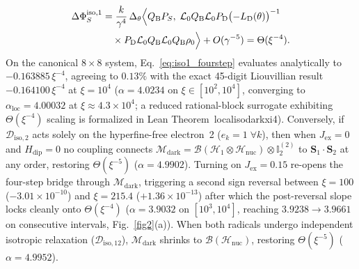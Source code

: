 \documentclass[twocolumn,10pt,amsmath,amssymb,floatfix]{revtex4-2}
\theoremstyle{plain}
\theoremstyle{definition}
\newcommand{\PS}{P_S}
\newcommand{\Hdip}{H_{\mathrm{dip}}}
\newcommand{\DeltaPhi}{\Delta\Phi_S}
\newcommand{\leanid}[1]{{\footnotesize\ttfamily\def\_{\textunderscore\allowbreak}#1}}
\begin{document}
\begin{enumerate}[leftmargin=1.4em,itemsep=2pt]
\begin{align}
\label{eq:iso1_fourstep}
\DeltaPhi^{\mathrm{iso},1} &= \frac{k}{\gamma^4}\,\Delta_\theta\Bigl\langle Q_{\mathrm{B}}\PS,\; \mathcal{L}_0 Q_{\mathrm{B}}\mathcal{L}_0 P_{\mathrm{D}} \bigl(-L_{\mathrm{D}}(\theta)\bigr)^{-1} \nonumber\\
&\quad \times P_{\mathrm{D}}\mathcal{L}_0 Q_{\mathrm{B}}\mathcal{L}_0 Q_{\mathrm{B}}\rho_0 \Bigr\rangle + O(\gamma^{-5}) = \Theta(\xi^{-4}).
\end{align}
On the canonical $8\times 8$ system, Eq.~\eqref{eq:iso1_fourstep} evaluates analytically to $-0.163885\,\xi^{-4}$, agreeing to $0.13\%$ with the exact 45-digit Liouvillian result $-0.164100\,\xi^{-4}$ at $\xi = 10^4$ ($\alpha = 4.0234$ on $\xi \in [10^2, 10^4]$, converging to $\alpha_{\mathrm{loc}} = 4.00032$ at $\xi \approx 4.3\times 10^4$; a reduced rational-block surrogate exhibiting $\Theta(\xi^{-4})$ scaling is formalized in Lean Theorem~\leanid{local\_iso\_dark\_xi4}). Conversely, if $\mathcal{D}_{\mathrm{iso},2}$ acts solely on the hyperfine-free electron~2 ($e_k = 1\;\forall k$), then when $J_{\mathrm{ex}}=0$ and $\Hdip = 0$ no coupling connects $\mathcal{M}_{\mathrm{dark}} = \mathcal{B}(\mathcal{H}_1\otimes\mathcal{H}_{\mathrm{nuc}})\otimes\mathbb{I}_2^{(2)}$ to $\mathbf{S}_1\cdot\mathbf{S}_2$ at any order, restoring $\Theta(\xi^{-5})$ ($\alpha = 4.9902$). Turning on $J_{\mathrm{ex}} = 0.15$ re-opens the four-step bridge through $\mathcal{M}_{\mathrm{dark}}$, triggering a second sign reversal between $\xi=100$ ($-3.01\times 10^{-10}$) and $\xi=215.4$ ($+1.36\times 10^{-13}$) after which the post-reversal slope locks cleanly onto $\Theta(\xi^{-4})$ ($\alpha = 3.9032$ on $[10^3, 10^4]$, reaching $3.9238 \to 3.9661$ on consecutive intervals, Fig.~\ref{fig2}(a)). When both radicals undergo independent isotropic relaxation ($\mathcal{D}_{\mathrm{iso},12}$), $\mathcal{M}_{\mathrm{dark}}$ shrinks to $\mathcal{B}(\mathcal{H}_{\mathrm{nuc}})$, restoring $\Theta(\xi^{-5})$ ($\alpha = 4.9952$).

\end{enumerate}
\end{document}
